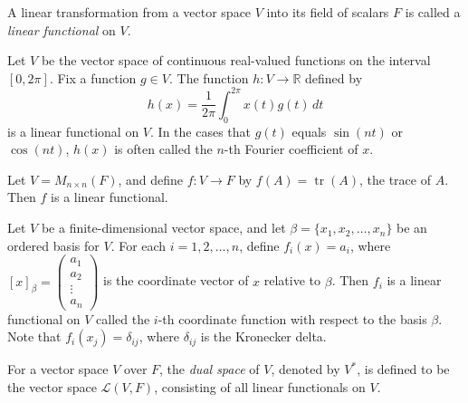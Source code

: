 \documentclass{report}
\begin{document}
    \begin{defBox}
        A linear transformation from a vector space \( V \) into its field of scalars \( F \) is called a \emph{linear functional} on \( V \).
        \end{defBox}
        
        \begin{Example}
        Let \( V \) be the vector space of continuous real-valued functions on the interval \([0, 2 \pi]\). Fix a function \( g \in V \). The function \( h: V \rightarrow \mathbb{R} \) defined by
        $$
        h(x) = \frac{1}{2\pi} \int_0^{2\pi} x(t)g(t)\, dt
        $$
        is a linear functional on \( V \). In the cases that \( g(t) \) equals \( \sin(nt) \) or \( \cos(nt) \), \( h(x) \) is often called the \( n \)-th Fourier coefficient of \( x \).
        \end{Example}
        
        \begin{Example}
        Let \( V = M_{n \times n}(F) \), and define \( f: V \rightarrow F \) by \( f(A) = \operatorname{tr}(A) \), the trace of \( A \). Then \( f \) is a linear functional.
        \end{Example}
        
        \begin{Example}
        Let \( V \) be a finite-dimensional vector space, and let \( \beta = \{x_1, x_2, \ldots, x_n\} \) be an ordered basis for \( V \). For each \( i = 1, 2, \ldots, n \), define \( f_i(x) = a_i \), where \( [x]_{\beta} = \begin{pmatrix} a_1 \\ a_2 \\ \vdots \\ a_n \end{pmatrix} \) is the coordinate vector of \( x \) relative to \( \beta \). Then \( f_i \) is a linear functional on \( V \) called the \( i \)-th coordinate function with respect to the basis \( \beta \). Note that \( f_i(x_j) = \delta_{ij} \), where \( \delta_{ij} \) is the Kronecker delta.
        \end{Example}
        
        \begin{defBox}
        For a vector space \( V \) over \( F \), the \emph{dual space} of \( V \), denoted by \( V^* \), is defined to be the vector space \( \mathcal{L}(V, F) \), consisting of all linear functionals on \( V \).
        \end{defBox}
        
\end{document}

